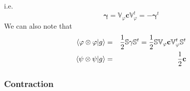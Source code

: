 \documentclass[aps,preprint]{revtex4}
\begin{document}
i.e. 
\begin{equation}
\mathbf{\gamma =}\mathbb{V}_{\varphi }\mathbf{c}\mathbb{V}_{\varphi }^{t}=-%
\mathbf{\gamma }^{t}
\end{equation}%
We can also note that 
\begin{eqnarray}
\left\langle \mathbf{\varphi \otimes \varphi }|g\right\rangle &=&\frac{1}{2}%
\mathbb{S}\mathbf{\gamma }\mathbb{S}^{t}=\frac{1}{2}\mathbb{SV}_{\varphi }%
\mathbf{c}\mathbb{V}_{\varphi }^{t}\mathbb{S}^{t}  \notag \\
\left\langle \mathbf{\psi \otimes \psi }|g\right\rangle &=&\frac{1}{2}%
\mathbf{c}
\end{eqnarray}

\subsubsection{Contraction}
\end{document}
